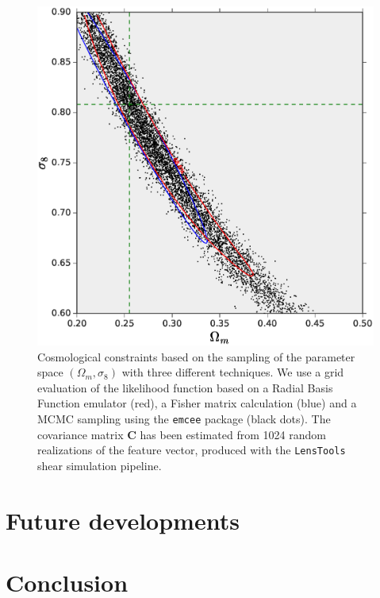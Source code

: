 \documentclass[reprint,aps,prd,superscriptaddress,showkeys,showpacs]{revtex4-1}
\newcommand{\bb}[1]{\mathbf{#1}}
\newcommand{\ttt}[1]{\texttt{#1}}
\newcommand{\LT}{\texttt{LensTools} }
\begin{document}
\begin{figure}
\includegraphics[scale=0.4]{Figures/parameter_sampling.eps}
\caption{Cosmological constraints based on the sampling of the parameter space $(\Omega_m,\sigma_8)$ with three different techniques. We use a grid evaluation of the likelihood function based on a Radial Basis Function emulator (red), a Fisher matrix calculation (blue) and a MCMC sampling using the \ttt{emcee} package (black dots). The covariance matrix $\bb{C}$ has been estimated from 1024 random realizations of the feature vector, produced with the \LT shear simulation pipeline.}
\label{samplingfig}
\end{figure}


\section{Future developments}


\section{Conclusion}
\end{document}
